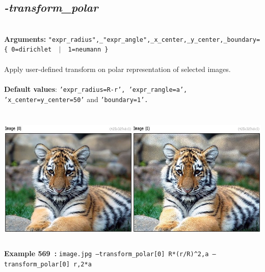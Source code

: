 \documentclass[a4paper,11pt,twoside]{book}
\begin{document}
\subsection{\emph{-transform\_polar} }\vspace*{-0.5em}
~\\\textbf{Arguments: } 
{\small \texttt{"expr\_radius",\_"expr\_angle",\_x\_center,\_y\_center,\_boundary=\{ 0=dirichlet ~$|$~ 1=neumann \}}}\\~\\
Apply user-defined transform on polar representation of selected images.
~\\~\\\textbf{Default values}: {\small \texttt{'expr\_radius=R-r', 'expr\_rangle=a', 'x\_center=y\_center=50'} and \texttt{'boundary=1'.}}
\begin{center}\includegraphics[keepaspectratio=true,height=7cm,width=\textwidth]{img/gmic_def569.jpg}\\
{\footnotesize \textbf{Example 569~:} \texttt{image.jpg --transform\_polar[0] R*(r/R)\textasciicircum 2,a --transform\_polar[0] r,2*a}}
\end{center}
\end{document}
